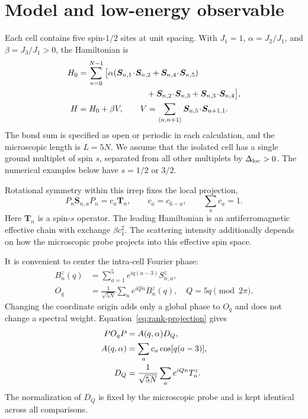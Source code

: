 \section{Model and low-energy observable}

Each cell contains five spin-$1/2$ sites at unit spacing. With $J_1=1$,
$\alpha=J_2/J_1$, and $\beta=J_3/J_1>0$, the Hamiltonian is
\begin{align}
 H_0&=\sum_{n=0}^{N-1}\big[
 \alpha(\bm S_{n,1}\!\cdot\!\bm S_{n,2}
       +\bm S_{n,4}\!\cdot\!\bm S_{n,5})\notag\\
 &\hspace{29mm}+\bm S_{n,2}\!\cdot\!\bm S_{n,3}
       +\bm S_{n,3}\!\cdot\!\bm S_{n,4}\big],\\
 H&=H_0+\beta V,\qquad
 V=\sum_{\langle n,n+1\rangle}\bm S_{n,5}\!\cdot\!\bm S_{n+1,1}.
 \label{eq:rank-ham}
\end{align}
The bond sum is specified as open or periodic in each calculation, and the
microscopic length is $L=5N$. We assume that the isolated cell has a single
ground multiplet of spin $s$, separated from all other multiplets by
$\Delta_{\mathrm{loc}}>0$. The numerical examples below have $s=1/2$ or $3/2$.

Rotational symmetry within this irrep fixes the local projection,
\begin{equation}
 P_n\bm S_{n,a}P_n=c_a\bm T_n,\qquad
 c_a=c_{6-a},\qquad \sum_a c_a=1.
 \label{eq:rank-projection}
\end{equation}
Here $\bm T_n$ is a spin-$s$ operator. The leading Hamiltonian is an
antiferromagnetic effective chain with exchange $\beta c_1^2$.
The scattering intensity additionally depends on how the microscopic
probe projects into this effective spin space.

It is convenient to center the intra-cell Fourier phase:
\begin{align}
 B_n^z(q)&=\sum_{a=1}^5 e^{iq(a-3)}S_{n,a}^z,\\
 O_q&=\frac{1}{\sqrt{5N}}\sum_n e^{iQn}B_n^z(q),
 \quad Q=5q\pmod{2\pi}.
\end{align}
Changing the coordinate origin adds only a global phase to $O_q$ and does not
change a spectral weight. Equation~\eqref{eq:rank-projection} gives
\begin{align}
 P O_qP&=A(q,\alpha)D_Q,\notag\\
 A(q,\alpha)&=\sum_a c_a\cos[q(a-3)],\\
 D_Q&=\frac{1}{\sqrt{5N}}\sum_n e^{iQn}T_n^z.
 \label{eq:rank-amplitude}
\end{align}
The normalization of $D_Q$ is fixed by the microscopic probe and is
kept identical across all comparisons.

